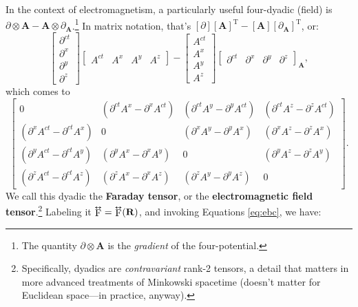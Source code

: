 \documentclass[12pt]{article}
\renewcommand{\vv}[1]{\mathbf{#1}}
\newcommand{\tightoverset}[2]{%
  \mathop{#2}\limits^{\vbox to -.5ex{\kern-0.75ex\hbox{$#1$}\vss}}}
\newcommand{\inlinedy}[1]{\tightoverset{\text{\tiny$\bm\leftrightarrow$}}{#1}}
\begin{document}
In the context of electromagnetism, a particularly useful four-dyadic (field) is $\partialup \otimes \vv A - \vv A \otimes \partialup_{\vv A}$.\footnote{The quantity $\partialup \otimes \vv A$ is the \emph{gradient} of the four-potential.} In matrix notation, that's $[\partialup][\vv A]^{\mathrm{T}} - [\vv A][\partialup_{\vv A}]^{\mathrm{T}}$, or:
\begin{equation*}
\begin{bmatrix}
\partial^{ct} \\
\partial^x \\
\partial^y \\
\partial^z
\end{bmatrix}
\begin{bmatrix}
A^{ct} & A^x & A^y & A^z
\end{bmatrix}
-
\begin{bmatrix}
A^{ct} \\
A^x \\
A^y \\
A^z
\end{bmatrix}
\begin{bmatrix}
\partial^{ct} & \partial^x & \partial^y & \partial^z
\end{bmatrix}_{\vv A},
\end{equation*}
which comes to
\begin{equation*}
\begin{bmatrix}
0 & ( \partial^{ct} A^x - \partial^x A^{ct} ) & ( \partial^{ct} A^y - \partial^y A^{ct} ) & ( \partial^{ct} A^z - \partial^z A^{ct} ) \\[1.5ex]
( \partial^x A^{ct} - \partial^{ct} A^x ) & 0 & ( \partial^x A^y - \partial^y A^x ) & ( \partial^x A^z - \partial^z A^x ) \\[1.5ex]
( \partial^y A^{ct} - \partial^{ct} A^y ) & ( \partial^y A^x - \partial^x A^y ) & 0 & ( \partial^y A^z - \partial^z A^y ) \\[1.5ex]
( \partial^z A^{ct} - \partial^{ct} A^z ) & ( \partial^z A^x - \partial^x A^z ) & ( \partial^z A^y - \partial^y A^z ) & 0
\end{bmatrix} .
\end{equation*}
We call this dyadic the \textbf{Faraday tensor}, or the \textbf{electromagnetic field tensor}.\footnote{\label{fn:dy}Specifically, dyadics are \emph{contravariant} rank-2 tensors, a detail that matters in more advanced treatments of Minkowski spacetime (doesn't matter for Euclidean space---in practice, anyway).} Labeling it $\inlinedy{\mathrm{F}} = \inlinedy{\mathrm{F}} (\vv R)$, and invoking Equations \ref{eq:ebc}, we have:
\end{document}
